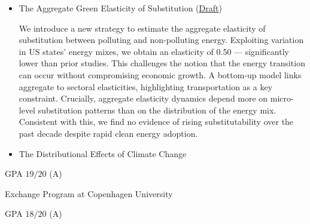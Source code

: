 \documentclass{practical-resume}
\begin{document}
	\begin{itemize}
	\item The Aggregate Green Elasticity of Substitution (\href{https://ruiagmsousa.github.io/research/agg-green-elasticity}{Draft})
		
	\begin{cvabstract}
We introduce a new strategy to estimate the aggregate elasticity of substitution between polluting and non-polluting energy. Exploiting variation in US states' energy mixes, we obtain an elasticity of 0.50 --- significantly lower than prior studies. This challenges the notion that the energy transition can occur without compromising economic growth. A bottom-up model links aggregate to sectoral elasticities, highlighting transportation as a key constraint. Crucially, aggregate elasticity dynamics depend more on micro-level substitution patterns than on the distribution of the energy mix. Consistent with this, we find no evidence of rising substitutability over the past decade despite rapid clean energy adoption.
	\end{cvabstract}

	\end{itemize}

	\begin{itemize}
		\item The Distributional Effects of Climate Change
	\end{itemize}
	

	\begin{position}{}{}
		\item GPA $19/20$ (A)
		\item Exchange Program at Copenhagen University
	\end{position}

	\begin{position}{}{}
		\item GPA $18/20$ (A)
	\end{position}

\end{document}
